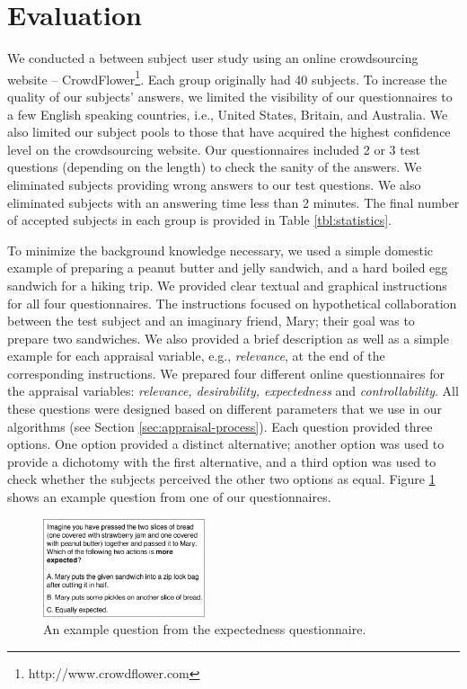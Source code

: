 \documentclass{aamas2016}
\begin{document}
\vspace*{-3mm}
\section{Evaluation}
\label{sec:user-study}

We conducted a between subject user study using an online crowdsourcing
website -- CrowdFlower\footnote{http://www.crowdflower.com}. Each group
originally had 40 subjects. To increase the quality of our subjects' answers, we
limited the visibility of our questionnaires to a few English speaking
countries, i.e., United States, Britain, and Australia. We also limited our
subject pools to those that have acquired the highest confidence level on the
crowdsourcing website. Our questionnaires included 2 or 3 test questions
(depending on the length) to check the sanity of the answers. We eliminated
subjects providing wrong answers to our test questions. We also eliminated
subjects with an answering time less than 2 minutes. The final number of
accepted subjects in each group is provided in Table \ref{tbl:statistics}.

To minimize the background knowledge necessary, we used a simple domestic
example of preparing a peanut butter and jelly sandwich, and a hard boiled egg
sandwich for a hiking trip. We provided clear textual and graphical instructions
for all four questionnaires. The instructions focused on hypothetical
collaboration between the test subject and an imaginary friend, Mary; their goal
was to prepare two sandwiches. We also provided a brief description as well as a
simple example for each appraisal variable, e.g., \textit{relevance}, at the end
of the corresponding instructions. We prepared four different online
questionnaires for the appraisal variables: \textit{relevance, desirability,
expectedness} and \textit{controllability}. All these questions were designed
based on different parameters that we use in our algorithms (see Section
\ref{sec:appraisal-process}). Each question provided three options. One option
provided a distinct alternative; another option was used to provide a dichotomy
with the first alternative, and a third option was used to check whether the
subjects perceived the other two options as equal. Figure \ref{fig:qs} shows an
example question from one of our questionnaires.

\begin{figure}[tbh]
  \centering
  \includegraphics[width=0.425\textwidth]{figure/question-sample-croped.pdf}
  \caption{{\fontsize{9}{9}\selectfont An example question from the expectedness
  questionnaire.}}
  \label{fig:qs}
\end{figure}
\end{document}
